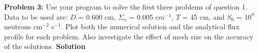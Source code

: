 \documentclass{amsart}
\theoremstyle{definition}
\begin{document}
\newpage
\textbf{Problem 3:} Use your program to solve the first three problems of question 1. Data to be used are: $D$ = 0.600 cm, $\Sigma_a$ = 0.005 $cm^{-1}$, $T$ = 45 cm, and $S_0$ = $10^8$ neutrons cm${}^{-2}$ s${}^{-1}$. Plot both the numerical solution and the analytical flux profile for each problem. Also investigate the effect of mesh size on the accuracy of the solutions.
\bigbreak
\newpage
\textbf{Solution}
 
\bigbreak
\end{document}
